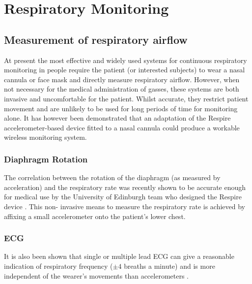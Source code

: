 \section{Respiratory Monitoring}

\subsection{Measurement of respiratory airflow}
At present the most effective and widely used systems for continuous respiratory monitoring in
people require the patient (or interested subjects) to wear a nasal cannula or face mask and directly
measure respiratory airflow. However, when not necessary for the medical administration of gasses,
these systems are both invasive and uncomfortable for the patient\cite{NasalCannula2011}. Whilst accurate, they
restrict patient movement and are unlikely to be used for long periods of time for monitoring alone.
It has however been demonstrated that an adaptation of the Respire accelerometer-based device
fitted to a nasal cannula could produce a workable wireless monitoring system.

\subsubsection{Diaphragm Rotation}
The correlation between the rotation of the diaphragm (as measured by acceleration) and the
respiratory rate was recently shown to be accurate enough for medical use by the University of
Edinburgh team who designed the Respire device \cite{BatesLingMannArvind2010}. This non-
invasive means to measure the respiratory rate is achieved by affixing a small accelerometer onto
the patient's lower chest.


\subsubsection{\acf{ECG}}
It is also been shown that single or multiple lead \ac{ECG} can give a reasonable indication of respiratory
frequency ($\pm4$ breaths a minute) and is more independent of the wearer's movements than
accelerometers \cite{ZhaoZhaoQun2008, BoyleBidargaddiSarelaKarunanithi2009}.

